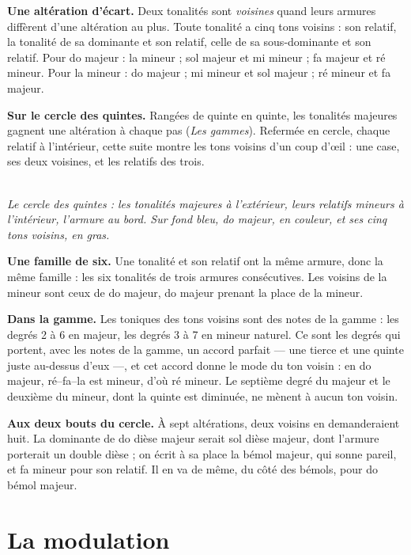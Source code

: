 \documentclass[a4paper,11pt]{article}
\newcommand{\legende}[1]{\\[4pt]{\small\itshape\color{mygray} #1}}
\begin{document}
\textbf{Une altération d'écart.} Deux tonalités sont \emph{voisines} quand
leurs armures diffèrent d'une altération au plus. Toute tonalité a cinq tons
voisins : son relatif, la tonalité de sa dominante et son relatif, celle de sa
sous-dominante et son relatif. Pour do majeur : la mineur ; sol majeur et mi
mineur ; fa majeur et ré mineur. Pour la mineur : do majeur ; mi mineur et sol
majeur ; ré mineur et fa majeur.

\textbf{Sur le cercle des quintes.} Rangées de quinte en quinte, les tonalités
majeures gagnent une altération à chaque pas (\emph{Les gammes}). Refermée en
cercle, chaque relatif à l'intérieur, cette suite montre les tons voisins d'un
coup d'œil : une case, ses deux voisines, et les relatifs des trois.

\begin{center}

\legende{Le cercle des quintes : les tonalités majeures à l'extérieur, leurs
relatifs mineurs à l'intérieur, l'armure au bord. Sur fond bleu, do majeur, en
couleur, et ses cinq tons voisins, en gras.}
\end{center}

\textbf{Une famille de six.} Une tonalité et son relatif ont la même armure,
donc la même famille : les six tonalités de trois armures consécutives. Les
voisins de la mineur sont ceux de do majeur, do majeur prenant la place de la
mineur.

\textbf{Dans la gamme.} Les toniques des tons voisins sont des notes de la
gamme : les degrés 2 à 6 en majeur, les degrés 3 à 7 en mineur naturel. Ce sont
les degrés qui portent, avec les notes de la gamme, un accord parfait --- une
tierce et une quinte juste au-dessus d'eux ---, et cet accord donne le mode du
ton voisin : en do majeur, ré--fa--la est mineur, d'où ré mineur. Le septième
degré du majeur et le deuxième du mineur, dont la quinte est diminuée, ne
mènent à aucun ton voisin.

\begin{remarque}
\textbf{Aux deux bouts du cercle.} À sept altérations, deux voisins en
demanderaient huit. La dominante de do dièse majeur serait sol dièse majeur,
dont l'armure porterait un double dièse ; on écrit à sa place la bémol majeur,
qui sonne pareil, et fa mineur pour son relatif. Il en va de même, du côté des
bémols, pour do bémol majeur.
\end{remarque}

\section{La modulation}
\label{sec:modulation}
\end{document}
